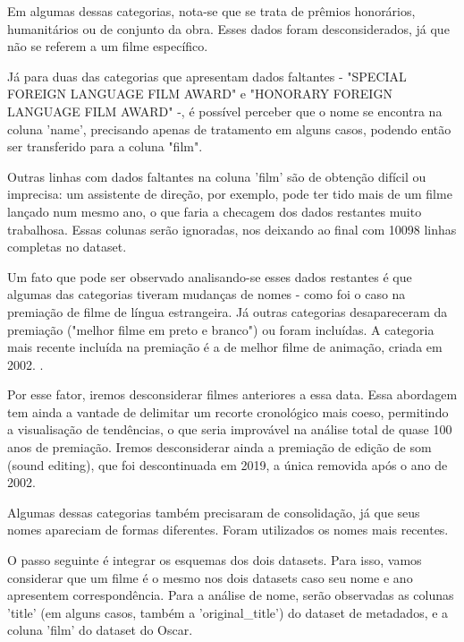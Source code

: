             Em algumas dessas categorias, nota-se que se trata de prêmios honorários, humanitários ou de conjunto da obra. Esses dados foram desconsiderados, já que não se referem a um filme específico.
            
            Já para duas das categorias que apresentam dados faltantes - "SPECIAL FOREIGN LANGUAGE FILM AWARD"
            e "HONORARY FOREIGN LANGUAGE FILM AWARD" -, é possível perceber que o nome se encontra na coluna 'name', precisando apenas de tratamento em alguns casos, podendo então ser transferido para a coluna "film".
            
            Outras linhas com dados faltantes na coluna 'film' são de obtenção difícil ou imprecisa: um assistente de direção, por exemplo, pode ter tido mais de um filme lançado num mesmo ano, o que faria a checagem dos dados restantes muito trabalhosa. Essas colunas serão ignoradas, nos deixando ao final com 10098 linhas completas no dataset.
            
            Um fato que pode ser observado analisando-se esses dados restantes é que algumas das categorias tiveram mudanças de nomes - como foi o caso na premiação de filme de língua estrangeira. Já outras categorias desapareceram da premiação ("melhor filme em preto e branco") ou foram incluídas. A categoria mais recente incluída na premiação é a de melhor filme de animação, criada em 2002. \cite{usatoday2002}.
            
            Por esse fator, iremos desconsiderar filmes anteriores a essa data. Essa abordagem tem ainda a vantade de delimitar um recorte cronológico mais coeso, permitindo a visualisação de tendências, o que seria improvável na análise total de quase 100 anos de premiação. Iremos desconsiderar ainda a premiação de edição de som (sound editing), que foi descontinuada em 2019, a única removida após o ano de 2002.\cite{deadline2020}
            
            Algumas dessas categorias também precisaram de consolidação, já que seus nomes apareciam de formas diferentes. Foram utilizados os nomes mais recentes.
            
            O passo seguinte é integrar os esquemas dos dois datasets. Para isso, vamos considerar que um filme é o mesmo nos dois datasets caso seu nome e ano apresentem correspondência. Para a análise de nome, serão observadas as colunas 'title' (em alguns casos, também a 'original\_title') do dataset de metadados, e a coluna 'film' do dataset do Oscar.

